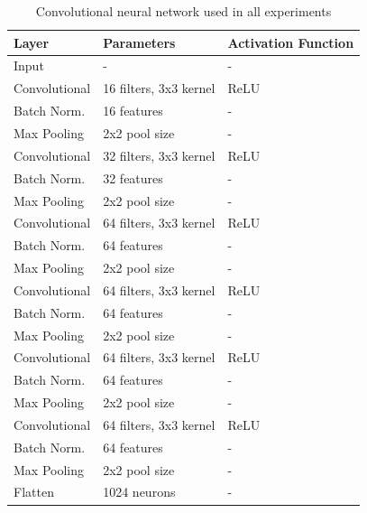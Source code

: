 \documentclass{article}
\begin{document}
\begin{table}[h]
  \centering
  \begin{tabular}{l|l|l}
    \textbf{Layer} & \textbf{Parameters} & \textbf{Activation Function} \\ \hline
    Input & - & - \\
    Convolutional & 16 filters, 3x3 kernel & ReLU \\
    Batch Norm. & 16 features & - \\
    Max Pooling & 2x2 pool size & - \\
    Convolutional & 32 filters, 3x3 kernel & ReLU \\
    Batch Norm. & 32 features & - \\
    Max Pooling & 2x2 pool size & - \\
    Convolutional & 64 filters, 3x3 kernel & ReLU \\
    Batch Norm. & 64 features & - \\
    Max Pooling & 2x2 pool size & - \\
    Convolutional & 64 filters, 3x3 kernel & ReLU \\
    Batch Norm. & 64 features & - \\
    Max Pooling & 2x2 pool size & - \\
    Convolutional & 64 filters, 3x3 kernel & ReLU \\
    Batch Norm. & 64 features & - \\
    Max Pooling & 2x2 pool size & - \\
    Convolutional & 64 filters, 3x3 kernel & ReLU \\
    Batch Norm. & 64 features & - \\
    Max Pooling & 2x2 pool size & - \\
    Flatten & 1024 neurons & - \\
  \end{tabular}
  \caption{Convolutional neural network used in all experiments}
  \label{tab:CNN}
\end{table}

\newpage


\end{document}
